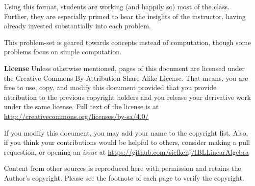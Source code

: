 \documentclass{problemset}
\begin{document}
Using this format, students are working (and happily so) most of the class. Further,
they are especially primed to hear the insights of the instructor, having already
invested substantially into each problem.

This problem-set is geared towards concepts instead of computation, though some problems
focus on simple computation.

{\bf License} Unless otherwise mentioned, pages of this document are licensed under
the Creative Commons By-Attribution Share-Alike License. That means, you are free
to use, copy, and modify this document provided that you provide attribution to the
previous copyright holders and you release your derivative work under the same license.
Full text of the license is at \url{http://creativecommons.org/licenses/by-sa/4.0/}

If you modify this document, you may add your name to the copyright list. Also,
if you think your contributions would be helpful to others, consider making a
pull requestion, or opening an \emph{issue} at \url{https://github.com/siefkenj/IBLLinearAlgebra}

Content from other sources is reproduced here with permission and retains the
Author's copyright. Please see the footnote of each page to verify the
copyright.

\newpage

\end{document}

